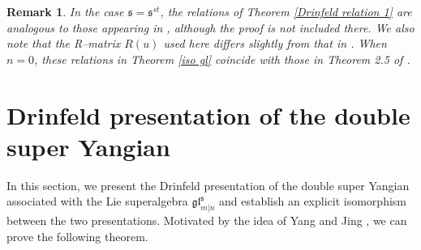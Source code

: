 \documentclass[a4paper,12pt]{article}
\newtheorem{rema}[theo]{Remark}
\numberwithin{equation}{section}
\begin{document}
\begin{rema}
In the case $\mathfrak{s}=\mathfrak{s}^{st}$, the relations of Theorem \ref{Drinfeld relation 1} are analogous to those appearing in \cite{Z97}, although the proof is not included there. We also note that the R--matrix $R(u)$ used here differs slightly from that in \cite{Z97}.
When $n=0$, these relations in Theorem \ref{iso gl} coincide with those in Theorem 2.5 of \cite{YJ24}.
\end{rema}
 


\section{Drinfeld presentation of the double super Yangian}

In this section, we present the Drinfeld presentation of the double super Yangian associated with the Lie superalgebra $\mathfrak{gl}_{m|n}^{\mathfrak{s}}$ and establish an explicit isomorphism between the two presentations. Motivated by the idea of Yang and Jing \cite{YJ24}, we can prove the following theorem.
\end{document}
